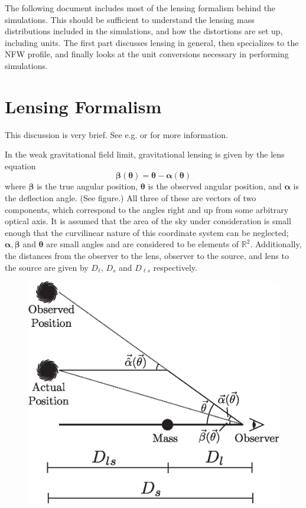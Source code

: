 \documentclass[10pt,twoside]{article}
\theoremstyle{definition}
\theoremstyle{exercise}
\newcommand{\R}{\mathbb{R}}
\renewcommand{\v}[1]{\boldsymbol{#1}}%
\begin{document}
The following document includes most of the lensing formalism behind the simulations. This should be sufficient to understand the lensing mass distributions included in the simulations, and how the distortions are set up, including units. The first part discusses lensing in general, then specializes to the NFW profile, and finally looks at the unit conversions necessary in performing simulations.

\section{Lensing Formalism}
This discussion is very brief. See e.g. \cite{Narayan:1996ba} or \cite{VanWaerbeke:2003uq} for more information.

In the weak gravitational field limit, gravitational lensing is given by the lens equation \cite{Narayan:1996ba}
\begin{equation}
		\v{\beta}(\v{\theta}) = \v{\theta} - \v{\alpha}(\v{\theta})
		\label{eq:lens}
\end{equation}
where $\v{\beta}$ is the true angular position, $\v{\theta}$ is the observed angular position, and $\v{\alpha}$ is the deflection angle. (See figure.) All three of these are vectors of two components, which correspond to the angles right and up from some arbitrary optical axis. It is assumed that the area of the sky under consideration is small enough that the curvilinear nature of this coordinate system can be neglected; $\v{\alpha}, \v{\beta}$ and $\v{\theta}$ are small angles and are considered to be elements of $\R^2$. Additionally, the distances from the observer to the lens, observer to the source, and lens to the source are given by $D_\ell$, $D_s$ and $D_{\ell s}$ respectively.

\begin{figure}[h]
		\center
		\includegraphics[scale=0.7]{../images/lensing_formalism.eps}
\end{figure}
\end{document}
